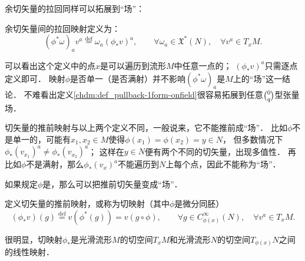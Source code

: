 余切矢量的拉回同样可以拓展到“场”：
\begin{definition}\label{chdm:def_pullback-1form-onfield}
    余切矢量间的{\heiti 拉回映射}定义为：
    \begin{equation}
        (\phi^{*}\omega)_a v^a \overset{\mathrm {def}}{=} \omega_a (\phi_{*}v)^a ,
        \qquad \forall \omega_a \in \mathfrak{X}^{*}(N),\quad \forall v^a \in T_{x}M .
    \end{equation}
\end{definition}

可以看出这个定义中的点$x$是可以遍历到流形$M$中任意一点的；
$(\phi_{*}v)^a$只需逐点定义即可．
映射$\phi$是否单一（是否满射）并不影响$(\phi^{*}\omega)_a$是$M$上的“场”这一结论．
不难看出定义\ref{chdm:def_pullback-1form-onfield}很容易拓展到任意$\binom{0}{q}$型张量场．

切矢量的推前映射与以上两个定义不同，一般说来，它不能推前成“场”．
比如$\phi$不是单一的，可能有$x_1,x_2\in M$使得$\phi(x_1)=\phi(x_2)=y\in N$，
但多数情况下$\phi_*(v_{x_1})^a \neq \phi_*(v_{x_2})^a$；
这样在$y\in N$便有两个不同的切矢量，出现多值性．
再比如$\phi$不是满射，那么$\phi_*(v_{x})^a$不能遍历到$N$上每个点，因此不能称为“场”． 

如果规定$\phi$是，那么可以把推前切矢量变成“场”．
\begin{definition}\label{chdm:def_pushforward-vector-onfield}
    定义切矢量的{\heiti 推前映射}，或称为{\heiti 切映射}（其中$\phi$是微分同胚）
    \begin{equation}\label{chdm:eqn_pushforward-vector-onfield}
        (\phi_{*}v)(g) \overset{\mathrm {def}}{=} v(\phi^{*}(g)) = v (g \circ \phi), 
        \qquad \forall g\in C^\infty_{\phi(x)}(N),\quad \forall v^a \in T_{x}M .
    \end{equation}
\end{definition}

很明显，切映射$\phi_{*}$是光滑流形$M$的切空间$T_xM$和光滑流形$N$的切空间$T_{\phi(x)}N$之间的线性映射．

